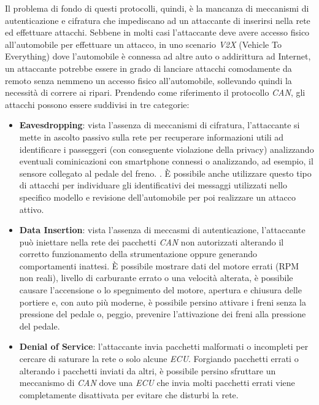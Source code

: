 Il problema di fondo di questi protocolli, quindi, è la mancanza di meccanismi di autenticazione e cifratura che impediscano ad un attaccante di inserirsi nella rete ed effettuare attacchi. Sebbene in molti casi l'attaccante deve avere accesso fisico all'automobile per effettuare un attacco, in uno scenario \emph{V2X} (Vehicle To Everything) dove l'automobile è connessa ad altre auto o addirittura ad Internet, un attaccante potrebbe essere in grado di lanciare attacchi comodamente da remoto senza nemmeno un accesso fisico all'automobile, sollevando quindi la necessità di correre ai ripari. Prendendo come riferimento il protocollo \emph{CAN}, gli attacchi possono essere suddivisi in tre categorie:
\begin{itemize}
    \item \textbf{Eavesdropping}: vista l'assenza di meccanismi di cifratura, l'attaccante si mette in ascolto passivo sulla rete per recuperare informazioni utili ad identificare i passeggeri (con conseguente violazione della privacy) analizzando eventuali cominicazioni con smartphone connessi o analizzando, ad esempio, il sensore collegato al pedale del freno. \cite{bozdal_samie_jennions_2018}. È possibile anche utilizzare questo tipo di attacchi per individuare gli identificativi dei messaggi utilizzati nello specifico modello e revisione dell'automobile per poi realizzare un attacco attivo.
    \item \textbf{Data Insertion}: vista l'assenza di meccasmi di autenticazione, l'attaccante può iniettare nella rete dei pacchetti \emph{CAN} non autorizzati alterando il corretto funzionamento della strumentazione oppure generando comportamenti inattesi. È possibile mostrare dati del motore errati (RPM non reali), livello di carburante errato o una velocità alterata, è possibile causare l'accensione o lo spegnimento del motore, apertura e chiusura delle portiere e, con auto più moderne, è possibile persino attivare i freni senza la pressione del pedale o, peggio, prevenire l'attivazione dei freni alla pressione del pedale.
    \item \textbf{Denial of Service}: l'attaccante invia pacchetti malformati o incompleti per cercare di saturare la rete o solo alcune \emph{ECU}. Forgiando pacchetti errati o alterando i pacchetti inviati da altri, è possibile persino sfruttare un meccanismo di \emph{CAN} dove una \emph{ECU} che invia molti pacchetti errati viene completamente disattivata per evitare che disturbi la rete. \cite{bozdal_samie_jennions_2018}
\end{itemize}

